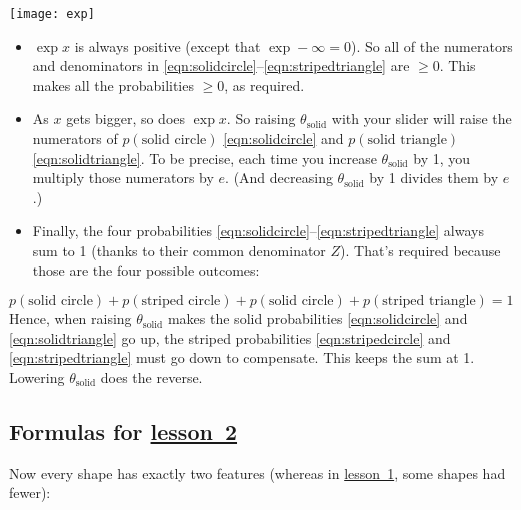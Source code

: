 \documentclass[11pt]{article}
\newcommand{\lesson}[1]{\href{http://cs.jhu.edu/~jason/tutorials/loglin/\##1}{lesson~#1}}
\begin{document}
\texttt{[image: exp]}
\begin{minipage}[b]{4in}
\vspace{4pt}
\begin{itemize}

\item $\exp x$ is always positive (except that $\exp
  -\infty=0$).  So all of the numerators and denominators in \eqref{eqn:solidcircle}--\eqref{eqn:stripedtriangle} are
  $\geq 0$.  This makes all the probabilities $\geq 0$, as required.

\item As $x$ gets bigger, so does $\exp x$.  So raising
  $\theta_{\textrm{solid}}$ with your slider will raise the numerators
  of $p(\text{solid circle})$ \eqref{eqn:solidcircle} and $p(\text{solid triangle})$
  \eqref{eqn:solidtriangle}.  To be precise, each time you increase
  $\theta_{\textrm{solid}}$ by 1, you multiply those numerators by
  $e$.  (And decreasing $\theta_{\textrm{solid}}$ by 1 divides them by $e$.)

\item Finally, the four probabilities
  \eqref{eqn:solidcircle}--\eqref{eqn:stripedtriangle} always sum to 1
  (thanks to their common denominator $Z$).  That's required because
  those are the four possible outcomes:
\end{itemize}
\end{minipage}
\vspace{-6pt}
\begin{equation}
  p(\text{solid circle}) + p(\text{striped circle}) + p(\text{solid circle}) + p(\text{striped triangle}) = 1
\end{equation}
Hence, when raising $\theta_{\textrm{solid}}$ makes the solid
probabilities \eqref{eqn:solidcircle} and \eqref{eqn:solidtriangle} go
up, the striped probabilities \eqref{eqn:stripedcircle} and
\eqref{eqn:stripedtriangle} must go down to compensate.
This keeps the sum at 1.  Lowering $\theta_{\textrm{solid}}$ does the reverse.

\subsection{Formulas for \lesson{2}}

Now every shape has exactly two features (whereas in \lesson{1}, some shapes had fewer):
\end{document}
